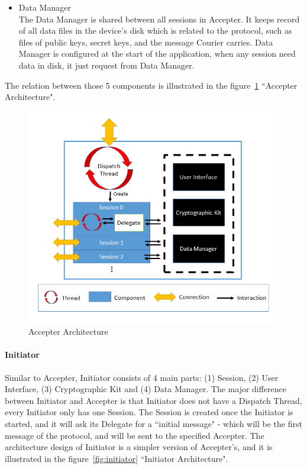\begin{itemize}
\item Data Manager \\
The Data Manager is shared between all sessions in Accepter. It keeps record of all data files in the device's disk which is related to the protocol, such as files of public keys, secret keys, and the message Courier carries. Data Manager is configured at the start of the application, when any session need data in disk, it just request from Data Manager.
\end{itemize}
The relation between those 5 components is illustrated in the figure~\ref{fig:accepter} ``Accepter Architecture".

\begin{figure}[h!]
\centering
\includegraphics[width=\textwidth,natwidth=696,natheight=589]{figures/accepterarchitecture.png}
\caption{Accepter Architecture}
\label{fig:accepter}
\end{figure}

\paragraph{Initiator}
Similar to Accepter, Initiator consists of 4 main parts: (1) Session, (2) User Interface, (3) Cryptographic Kit and (4) Data Manager. The major difference between Initiator and Accepter is that Initiator does not have a Dispatch Thread, every Initiator only has one Session. The Session is created once the Initiator is started, and it will ask its Delegate for a ``initial message" - which will be the first message of the protocol, and will be sent to the specified Accepter. The architecture design of Initiator is a simpler version of Accepter's, and it is illustrated in the figure~\ref{fig:initiator} ``Initiator Architecture".

